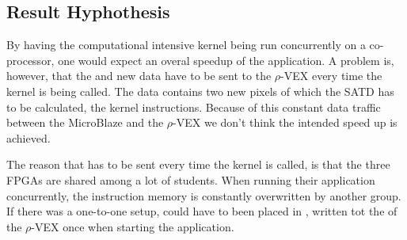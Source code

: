 \subsection{Result Hyphothesis}

By having the computational intensive kernel being run concurrently on a co-processor, one would expect an overal speedup of the application. A problem is, however, that the  and new data have to be sent to the $\rho$-VEX every time the kernel is being called. The data contains two new pixels of which the SATD has to be calculated,  the kernel instructions. Because of this constant data traffic between the MicroBlaze and the $\rho$-VEX we don't think the intended speed up is achieved.

The reason that  has to be sent every time the kernel is called, is that the three FPGAs are shared among a lot of students. When running their application concurrently, the instruction memory is constantly overwritten by another group. If there was a one-to-one setup,  could have to been placed in , written tot the  of the $\rho$-VEX once when starting the application. 


